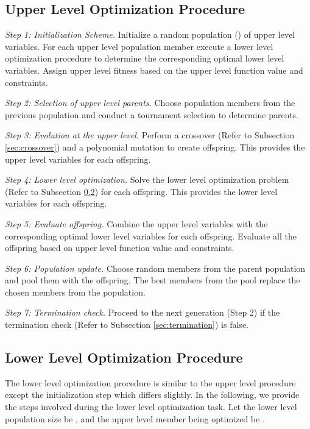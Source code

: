 \documentclass[twoside]{article}
\begin{document}
\subsection{Upper Level Optimization Procedure}\label{sec:upperLevel}
\textit{}
\vspace{-7mm}

\textit{Step 1: Initialization Scheme.} Initialize a random population () of upper level variables. For each upper level population member execute a lower level optimization procedure to determine the corresponding optimal lower level variables. Assign upper level fitness based on the upper level function value and constraints.

\textit{Step 2: Selection of upper level parents.} Choose  population members from the previous population and conduct a tournament selection to determine  parents.

\textit{Step 3: Evolution at the upper level.} Perform a crossover (Refer to Subsection \ref{sec:crossover}) and a polynomial mutation to create  offspring. This provides the upper level variables for each offspring.

\textit{Step 4: Lower level optimization.} Solve the lower level optimization problem (Refer to Subsection \ref{sec:lowerLevel}) for each offspring. This provides the lower level variables for each offspring.

\textit{Step 5: Evaluate offspring.} Combine the upper level variables with the corresponding optimal lower level variables for each offspring. Evaluate all the offspring based on upper level function value and constraints.

\textit{Step 6: Population update.} Choose  random members from the parent population and pool them with the  offspring. The best  members from the pool replace the chosen  members from the population.

\textit{Step 7: Termination check.} Proceed to the next generation (Step 2) if the termination check (Refer to Subsection \ref{sec:termination}) is false.

\subsection{Lower Level Optimization Procedure}\label{sec:lowerLevel}
The lower level optimization procedure is similar to the upper level procedure except the initialization step which differs slightly. In the following, we provide the steps involved during the lower level optimization task. Let the lower level population size be , and the upper level member being optimized be .
\end{document}
